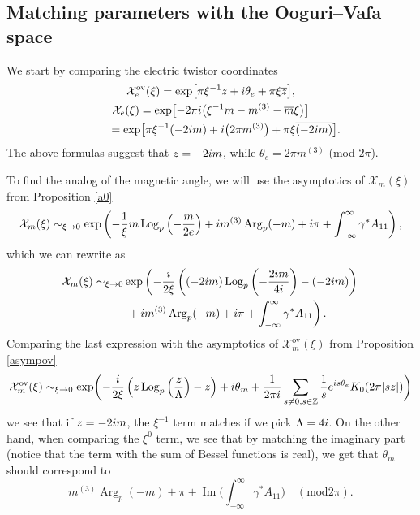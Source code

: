 \documentclass[11pt]{article}
\numberwithin{equation}{section}
\numberwithin{equation}{section}
\newcommand{\MC}{\mathcal{X}_m}
\begin{document}
\subsection{Matching parameters with the Ooguri--Vafa space}\label{OVP}

We start by comparing the electric twistor coordinates
\begin{gather}
 \mathcal{X}_e^{\text{ov}}(\xi)=\exp\bigl[\pi \xi^{-1}z+{\rm i}\theta_e +\pi\xi \overline{z}\bigr],\nonumber\\
 \mathcal{X}_e(\xi)=\exp \bigl[-2\pi {\rm i} \bigl(\xi^{-1}m -m^{(3)}-\overline{m}\xi\bigr)\bigr]\nonumber\\
 \phantom{ \mathcal{X}_e(\xi)}{}= \exp \bigl[\pi \xi^{-1}(-2{\rm i}m) + {\rm i}\bigl(2\pi m^{(3)}\bigr) + \pi \xi \overline{(-2{\rm i}m)}\bigr].\label{elecmatch}
\end{gather}
The above formulas suggest that $z=-2{\rm i}m$, while $\theta_e=2\pi m^{(3)}$ (mod $2\pi$).

To find the analog of the magnetic angle, we will use the asymptotics of $\MC(\xi)$ from Proposition \ref{a0}
\begin{equation*}
 \MC(\xi)\sim_{\xi \to 0}\exp \left(-\frac{1}{\xi}m\operatorname{Log}_p\left(-\frac{m}{2e}\right)+{\rm i}m^{(3)}\operatorname{Arg}_p(-m)+{\rm i}\pi +\int_{-\infty}^{\infty}\gamma^*A_{11}\right),
\end{equation*}
which we can rewrite as
\begin{align}
 \MC(\xi)\sim_{\xi \to 0}&\exp \left(-\frac{{\rm i}}{2\xi}\left((-2{\rm i}m)\operatorname{Log}_p\left(-\frac{2{\rm i}m}{4{\rm i}}\right)-(-2{\rm i}m)\right)\right.\nonumber\\
 &\left.{} +{\rm i}m^{(3)}\operatorname{Arg}_p(-m)+{\rm i}\pi +\int_{-\infty}^{\infty}\gamma^*A_{11}\right).\label{asy1}
\end{align}
Comparing the last expression with the asymptotics of $\MC^{\text{ov}}(\xi)$ from Proposition \ref{asympov}
\begin{equation}\label{asy2}
 \MC^{\text{ov}}(\xi) \sim_{\xi \to 0} \exp \biggl(-\frac{{\rm i}}{2\xi}\left(z\operatorname{Log}_p\left(\frac{z}{\Lambda}\right)-z\right) +{\rm i}\theta_m +\frac{1}{2\pi {\rm i}}\sum_{s\neq 0, s \in \mathbb{Z}}\frac{1}{s}{\rm e}^{{\rm i}s\theta_e}K_0(2\pi |sz|) \biggr)
\end{equation}
we see that if $z=-2{\rm i}m $, the $\xi^{-1}$ term matches if we pick $\Lambda = 4{\rm i}$. On the other hand, when comparing the $\xi^{0}$ term, we see that by matching the imaginary part (notice that the term with the sum of Bessel functions is real), we get that $\theta_m$ should correspond to
\begin{equation*}
 m^{(3)}\operatorname{Arg}_p(-m)+\pi +\operatorname{Im}\bigg(\int_{-\infty}^{\infty}\gamma^*A_{11}\bigg) \quad (\text{mod} 2\pi).
\end{equation*}
\end{document}
